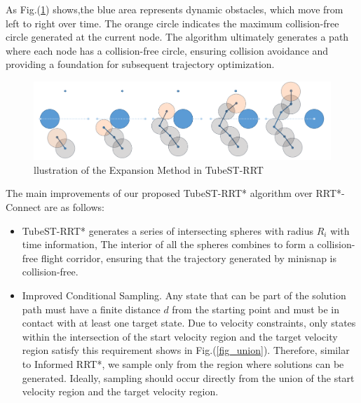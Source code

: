 \documentclass[conference]{IEEEtran}
\begin{document}
    As Fig.(\ref{fig2}) shows,the blue area represents dynamic obstacles, which move from left to right over time. The orange circle indicates the maximum collision-free circle generated at the current node. The algorithm ultimately generates a path where each node has a collision-free circle, ensuring collision avoidance and providing a foundation for subsequent trajectory optimization.
    \begin{figure}
		\centering
		\includegraphics[scale=0.07]{fig2.png}
		\caption{llustration of the Expansion Method in TubeST-RRT}
		\label{fig2}
	\end{figure}

    The main improvements of our proposed TubeST-RRT* algorithm over RRT*-Connect are as follows:
    \begin{itemize}
        \item TubeST-RRT* generates a series of intersecting spheres with radius \(R_i\) with time information, The interior of all the spheres combines to form a collision-free flight corridor, ensuring that the trajectory generated by minisnap is collision-free.
        \item Improved Conditional Sampling. Any state that can be part of the solution path must have a finite distance \(d\) from the starting point and must be in contact with at least one target state. Due to velocity constraints, only states within the intersection of the start velocity region and the target velocity region satisfy this requirement shows in Fig.(\ref{fig_union}). Therefore, similar to Informed RRT*, we sample only from the region where solutions can be generated. Ideally, sampling should occur directly from the union of the start velocity region and the target velocity region.
    \end{itemize}
\end{document}
